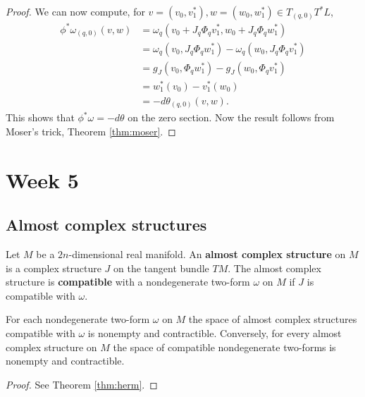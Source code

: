 \documentclass{amsart}
\begin{document}
\begin{proof}
    We can now compute, for $v=(v_0,v_1^*),w=(w_0,w_1^*)\in T_{(q,0)}T^*L$,
    \begin{align*}
        \phi^*\omega_{(q,0)}(v,w) &= \omega_q\left( v_0+J_q\Phi_qv_1^*, w_0+J_q\Phi_qw_1^* \right)\\
        &= \omega_q(v_0,J_q\Phi_qw_1^*)-\omega_q(w_0,J_q\Phi_qv_1^*)\\
        &= g_J(v_0,\Phi_qw_1^*) - g_J(w_0,\Phi_qv_1^*)\\
        &= w_1^*(v_0) - v_1^*(w_0)\\
        &= -d\theta_{(q,0)}(v,w).
    \end{align*}
    This shows that $\phi^*\omega=-d\theta$ on the zero section. Now the result follows
    from Moser's trick, Theorem \ref{thm:moser}.
\end{proof}

\newpage
\section{Week 5}

\subsection{Almost complex structures}
\begin{definition}
    Let $M$ be a $2n$-dimensional real manifold. An \textbf{almost complex structure} on
    $M$ is a complex structure $J$ on the tangent bundle $TM$. The almost complex structure
    is \textbf{compatible} with a nondegenerate two-form $\omega$ on $M$ if $J$ is compatible 
    with $\omega$.
\end{definition}

\begin{theorem}
    For each nondegenerate two-form $\omega$ on $M$ the space of almost complex structures
    compatible with $\omega$ is nonempty and contractible. Conversely, for every almost
    complex structure on $M$ the space of compatible nondegenerate two-forms is nonempty
    and contractible.
\end{theorem}
\begin{proof}
    See Theorem \ref{thm:herm}.
\end{proof}
\end{document}
